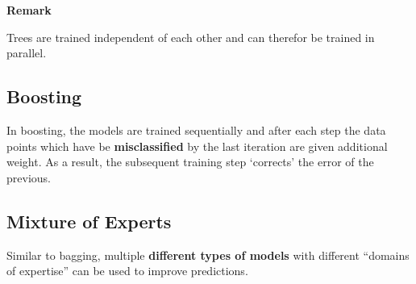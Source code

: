 \textbf{Remark}

Trees are trained independent of each other and can therefor be trained in parallel.

\subsection{Boosting}
In boosting, the models are trained sequentially and after each step the data points which have be \textbf{misclassified} by the last iteration are given additional weight.
As a result, the subsequent training step `corrects' the error of the previous.

\newpar{}

\subsection{Mixture of Experts}
Similar to bagging, multiple \textbf{different types of models} with different ``domains of expertise'' can be used to improve predictions.